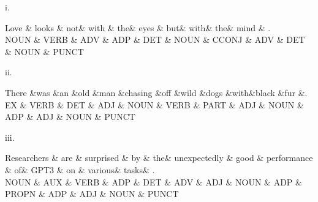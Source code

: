 i. \\
\begin{center}
{
 \begin{dependency}
 \begin{deptext}
 Love \& looks \& not\&  with \& the\&  eyes \& but\&  with\&  the\&  mind  \& .   \\
 NOUN \& VERB \& ADV \& ADP \& DET    \& NOUN \& CCONJ    \& ADV    \& DET \& NOUN  \& PUNCT \\
 \end{deptext}
 \end{dependency}
 }
 \end{center}

ii. \\
\begin{center}
 {
 \begin{dependency}
 \begin{deptext}
There \&was \&an \&old \&man \&chasing \&off \&wild \&dogs \&with\&black \&fur \&.     \\
    EX \& VERB  \& DET \& ADJ \& NOUN \& VERB \& PART \& ADJ \& NOUN   \& ADP   \& ADJ  \& NOUN  \& PUNCT \\
 \end{deptext}
 \end{dependency}
 }
 \end{center}

iii. \\
\begin{center}
 {\small
 \begin{dependency}
 \begin{deptext}
Researchers \& are \& surprised \& by \& the\&  unexpectedly \& good \& performance \& of\&  GPT3 \& on \& various\&  tasks\& . \\
 NOUN \& AUX \& VERB \& ADP \& DET  \& ADV \& ADJ \& NOUN  \& ADP \& PROPN   \& ADP \& ADJ   \& NOUN \& PUNCT \\
 \end{deptext}
 \end{dependency}
 }
 \end{center}

